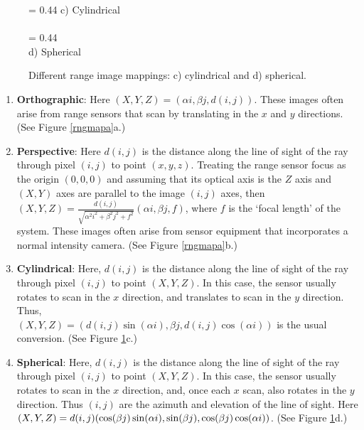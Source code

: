 \documentclass[twocolumn,oneside]{book}
\begin{document}
\begin{figure}[htb]
{\epsfxsize = 0.44\textwidth {}}
c) Cylindrical\\
\ \\
{\epsfxsize = 0.44\textwidth {}}\\
d) Spherical
\caption{Different range image mappings: c) cylindrical and d) spherical.
\label{rngmapb}}
\end{figure}
\begin{enumerate}

\item {\bf Orthographic}: 
Here $(X,Y,Z) = (\alpha i, \beta j, d(i,j))$.
These images often arise from range sensors that
  scan by translating in the $x$ and $y$ directions.
(See Figure \ref{rngmapa}a.)

\item {\bf Perspective}:
Here $d(i,j)$ is the distance along the line of sight of the ray through 
pixel $(i,j)$ to point $(x,y,z)$. Treating the range sensor focus
as the origin $(0,0,0)$ and assuming that its optical axis is the
$Z$ axis and $(X,Y)$ axes are parallel to the image $(i,j)$ axes, then 
$(X,Y,Z) = \frac{d(i,j)}{\sqrt{\alpha^2 i^2 + \beta^2 j^2 + f^2}}
(\alpha i, \beta j, f)$, where $f$ is the `focal length' of the system.
These images often arise from sensor equipment that incorporates a normal
intensity camera.
(See Figure \ref{rngmapa}b.)

\item {\bf Cylindrical}:
Here, $d(i,j)$ is the distance along the line of sight of the ray through 
pixel $(i,j)$ to point $(X,Y,Z)$. In this case, the sensor usually rotates
to scan in the $x$ direction, and translates to scan in the $y$ direction.
Thus, \\
$(X,Y,Z) = (d(i,j) \sin(\alpha i), \beta j, d(i,j) \cos(\alpha i))$ 
is the usual conversion.
(See Figure \ref{rngmapb}c.)

\item {\bf Spherical}:
Here, $d(i,j)$ is the distance along the line of sight of the ray through 
pixel $(i,j)$ to point $(X,Y,Z)$. In this case, the sensor usually rotates
to scan in the $x$ direction, and, once each $x$ scan, also rotates
in the $y$ direction. Thus $(i,j)$ are the azimuth and elevation of the
line of sight.
Here \\
$(X,Y,Z) =\\ d(i,j) (
\cos(\beta j) \sin(\alpha i),
\sin(\beta j),
\cos(\beta j) \cos(\alpha i))$.
(See Figure \ref{rngmapb}d.)


\end{enumerate}
\end{document}
